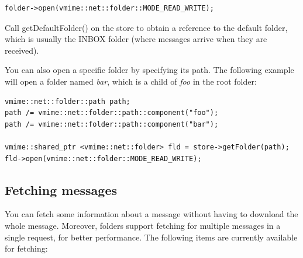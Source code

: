 \begin{lstlisting}
folder->open(vmime::net::folder::MODE_READ_WRITE);
\end{lstlisting}


Call {\vcode getDefaultFolder()} on the store to obtain a reference to the
default folder, which is usually the INBOX folder (where messages arrive when
they are received).

You can also open a specific folder by specifying its path. The following
example will open a folder named \emph{bar}, which is a child of \emph{foo}
in the root folder:

\begin{lstlisting}[caption={Opening a folder from its path}]
vmime::net::folder::path path;
path /= vmime::net::folder::path::component("foo");
path /= vmime::net::folder::path::component("bar");

vmime::shared_ptr <vmime::net::folder> fld = store->getFolder(path);
fld->open(vmime::net::folder::MODE_READ_WRITE);
\end{lstlisting}



\subsection{Fetching messages} %

You can fetch some information about a message without having to download the
whole message. Moreover, folders support fetching for multiple messages in
a single request, for better performance. The following items are currently
available for fetching:

